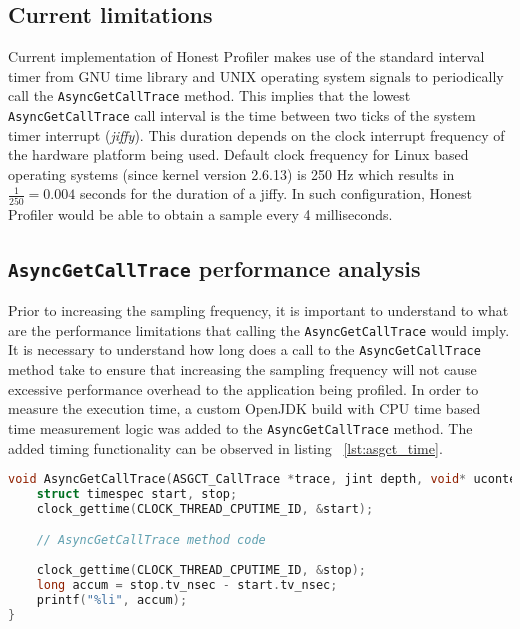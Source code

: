 \documentclass[..thesis.tex]{subfiles}
\begin{document}
\subsection{Current limitations}
Current implementation of Honest Profiler makes use of the standard interval timer from GNU time library and UNIX operating system signals to periodically call the \texttt{AsyncGetCallTrace} method. This implies that the lowest \texttt{AsyncGetCallTrace} call interval is the time between two ticks of the system timer interrupt (\textit{jiffy}). This duration depends on the clock interrupt frequency of the hardware platform being used. Default clock frequency for Linux based operating systems (since kernel version 2.6.13) is 250 Hz which results in $\frac{1}{250} = 0.004$ seconds for the duration of a jiffy. \cite{linux_time} In such configuration, Honest Profiler would be able to obtain a sample every 4 milliseconds.



\subsection{\texttt{AsyncGetCallTrace} performance analysis}
Prior to increasing the sampling frequency, it is important to understand to what are the performance limitations that calling the \texttt{AsyncGetCallTrace} would imply. It is necessary to understand how long does a call to the \texttt{AsyncGetCallTrace} method take  to ensure that increasing the sampling frequency will not cause excessive performance overhead to the application being profiled. In order to measure the execution time, a custom OpenJDK build with CPU time based time measurement logic was added to the \texttt{AsyncGetCallTrace} method. The added timing functionality can be observed in listing ~\ref{lst:asgct_time}.

\begin{lstlisting}[language=C++,style=def,label={lst:asgct_time}, caption={CPU time based measurement in \texttt{AsyncGetCallTrace} method}]
void AsyncGetCallTrace(ASGCT_CallTrace *trace, jint depth, void* ucontext) {
    struct timespec start, stop;
    clock_gettime(CLOCK_THREAD_CPUTIME_ID, &start);

    // AsyncGetCallTrace method code
    
    clock_gettime(CLOCK_THREAD_CPUTIME_ID, &stop);
    long accum = stop.tv_nsec - start.tv_nsec;
    printf("%li", accum);
}
\end{lstlisting}
\end{document}
